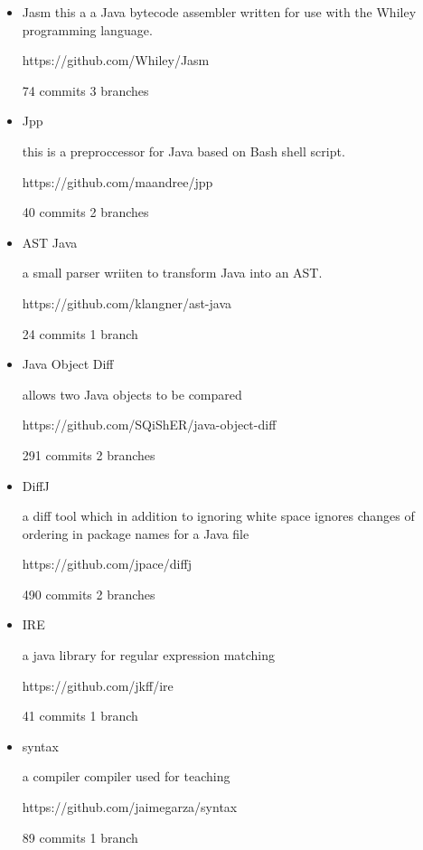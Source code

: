  \begin{itemize}
  \item Jasm
  this a a Java bytecode assembler written for use with the Whiley programming language.
  
  https://github.com/Whiley/Jasm
  
  74 commits 3 branches
  
  \item Jpp
  
  this is a preproccessor for Java based on Bash shell script. 
  
  https://github.com/maandree/jpp
  
  40 commits 2 branches
  
  \item AST Java
  
  a small parser wriiten to transform Java into an AST. 
  
  https://github.com/klangner/ast-java
  
  24 commits 1 branch
  
  \item Java Object Diff
  
  allows two Java objects to be compared 
  
  https://github.com/SQiShER/java-object-diff
  
  291 commits 2 branches
  
  \item DiffJ
  
  a diff tool which in addition to ignoring white space ignores changes of ordering in package names for a Java file 
  
  https://github.com/jpace/diffj
  
  490 commits 2 branches

  \item  IRE
  
  a java library for regular expression matching
  
  https://github.com/jkff/ire
  
  41 commits 1 branch
  
  \item syntax
  
  a compiler compiler used for teaching
  
  https://github.com/jaimegarza/syntax
  
  89 commits 1 branch
    
\end{itemize}





